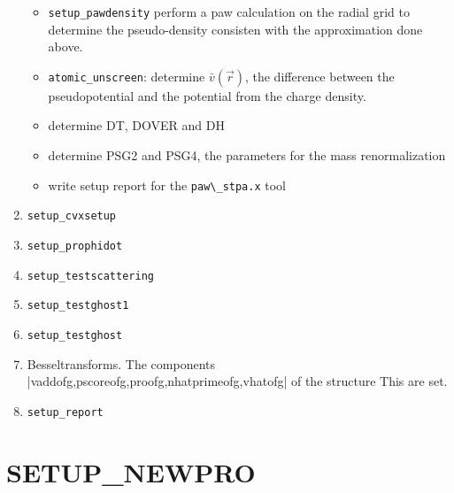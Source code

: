 \documentclass[11pt,a4paper]{report}
\begin{document}
\begin{enumerate}
\begin{itemize}
%
\item \verb|setup_pawdensity| perform a paw calculation on the radial
  grid to determine the pseudo-density consisten with the
  approximation done above.
%
\item \verb|atomic_unscreen|: determine $\bar{v}(\vec{r})$, the
difference between the pseudopotential and the potential from the
charge density.
%
\item determine DT, DOVER and DH
%
\item determine PSG2 and PSG4, the parameters for the mass renormalization
%
\item write setup report for the \verb|paw\_stpa.x| tool
\end{itemize}
%
\item \verb|setup_cvxsetup|
%
\item \verb|setup_prophidot|
%
\item \verb|setup_testscattering|
%
\item \verb|setup_testghost1|
%
\item \verb|setup_testghost|
%
\item Besseltransforms. The components
  |vaddofg,pscoreofg,proofg,nhatprimeofg,vhatofg| of the structure This are set.
%
\item \verb|setup_report|
%
\end{enumerate}


\section{SETUP\_NEWPRO}
\label{sec:newpro}
\end{document}
